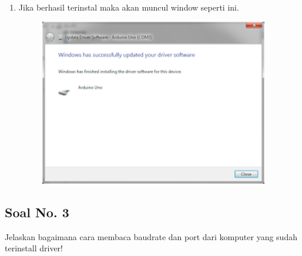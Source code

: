 \begin{enumerate}
\begin{figure}[H]
		\centering
	\end{figure}
	\item Jika berhasil terinstal maka akan muncul window seperti ini.
	\begin{figure}[H]
		\includegraphics[width=10cm]{figures/5/1174006/Teori/10.png}
		\centering
	\end{figure}
\end{enumerate}

\subsection{Soal No. 3}
Jelaskan bagaimana cara membaca baudrate dan port dari komputer yang sudah terinstall driver!

